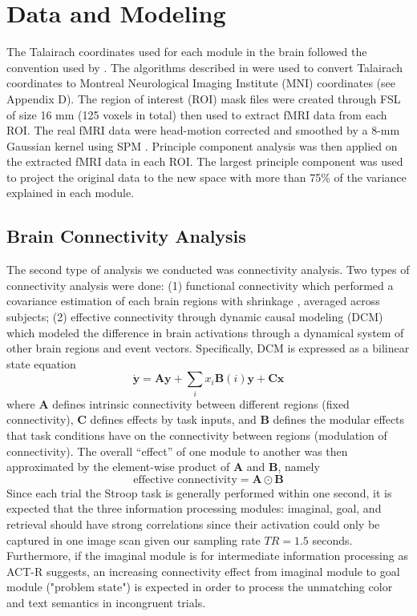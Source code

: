 \documentclass[10pt,letterpaper]{article}
\newcommand{\vct}[1]{\boldsymbol{#1}} %
\newcommand{\mat}[1]{\boldsymbol{#1}} %
\begin{document}
\section{Data and Modeling}

The Talairach coordinates used for each module in the brain followed the convention used by \cite{Anderson2008, Borst2017}. The algorithms described in \cite{Lacadie2008} were used to convert Talairach coordinates to Montreal Neurological Imaging Institute (MNI) coordinates (see Appendix D). The region of interest (ROI) mask files were created through FSL \cite{Woolrich2009} of size 16 mm (125 voxels in total) then used to extract fMRI data from each ROI. The real fMRI data were head-motion corrected and smoothed by a 8-mm Gaussian kernel using SPM \cite{Penny2006}. Principle component analysis was then applied on the extracted fMRI data in each ROI. The largest principle component was used to project the original data to the new space with more than 75\% of the variance explained in each module.

\subsection{Brain Connectivity Analysis}
The second type of analysis we conducted was connectivity analysis. Two types of connectivity analysis were done: (1) functional connectivity \cite{Rogers2007} which performed a covariance estimation of each brain regions with shrinkage \cite{Ledoit2004}, averaged across subjects; (2) effective connectivity through dynamic causal modeling (DCM) \cite{Friston2003, Stocco2018} which modeled the difference in brain activations through a dynamical system of other brain regions and event vectors. Specifically, DCM is expressed as a bilinear state equation
\[\dot{\vct{y}} = \mat{A}\vct{y} + \sum_{i}x_i\mat{B}(i)\vct{y} + \mat{C}\vct{x}\]
where $\mat{A}$ defines intrinsic connectivity between different regions (fixed connectivity), $\mat{C}$ defines effects by task inputs, and $\mat{B}$ defines the modular effects that task conditions have on the connectivity between regions (modulation of connectivity). The overall ``effect'' of one module
to another was then approximated by the element-wise product of $\mat{A}$ and $\mat{B}$, namely
\[\text{effective connectivity} = \mat{A} \odot \mat{B}\]
Since each trial the Stroop task is generally performed within one second, it is expected that the three information processing modules: imaginal, goal, and retrieval should have strong correlations since their activation could only be captured in one image scan given our sampling rate $TR = 1.5$ seconds. Furthermore, if the imaginal module is for intermediate information processing as ACT-R suggests, an increasing connectivity effect from imaginal module to goal module ("problem state") is expected in order to process the unmatching color and text semantics in incongruent trials.
\end{document}
